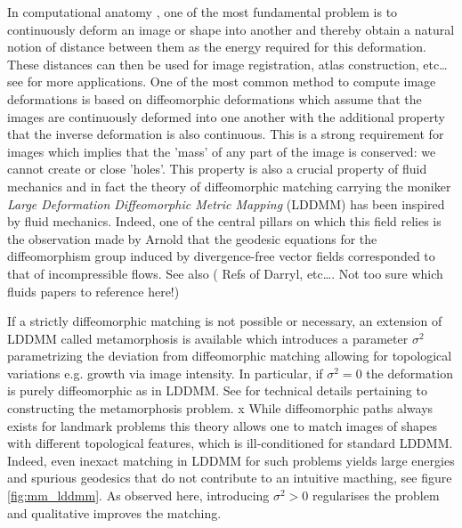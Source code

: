 \documentclass[runningheads]{llncs}
\begin{document}
In computational anatomy
\cite{grenander1994representations,grenander1998computational}, one of the most
fundamental problem is to continuously deform an image or shape into another and
thereby obtain a natural notion of distance between them as the energy required
for this deformation.  These distances can then be used for image registration,
atlas construction, etc\dots see \cite{todo} for more applications. One of the
most common method to compute image deformations is based on diffeomorphic
deformations which assume that the images are continuously deformed into one
another with the additional property that the inverse deformation is also
continuous.  This is a strong requirement for images which implies that the
'mass' of any part of the image is conserved: we cannot create or close 'holes'.
This property is also a crucial property of fluid mechanics and in fact the
theory of diffeomorphic matching carrying the moniker \emph{Large Deformation
Diffeomorphic Metric Mapping} \cite{trouve1998diffeomorphisms,beg2005computing}
(LDDMM) has been inspired by fluid mechanics. Indeed, one of the central pillars
on which this field relies is the observation made by Arnold
\cite{arnold1966geometrie} that the geodesic equations for the diffeomorphism
group induced by divergence-free vector fields corresponded to that of
incompressible flows. See also ({\color{red} Refs of Darryl,
etc\dots.}{\color{green} Not too sure which fluids papers to reference here!}) 

If a strictly diffeomorphic matching is not possible or necessary, an extension
of LDDMM called metamorphosis \cite{trouve2005metamorphoses,holm2009euler} is
available which introduces a parameter $\sigma^2$ parametrizing the deviation
from diffeomorphic matching allowing for topological variations e.g. growth via
image intensity. In particular, if $\sigma^2=0$ the deformation is purely
diffeomorphic as in LDDMM. See
\cite{trouve1995infinite,trouve2005local,miller2001group} for technical details
pertaining to constructing the metamorphosis problem. x While diffeomorphic
paths always exists for landmark problems \cite{guo2006diffeomorphic} this
theory allows one to match images of shapes with different topological features,
which is ill-conditioned for standard LDDMM. Indeed, even inexact matching in
LDDMM for such problems yields large energies and spurious geodesics that do not
contribute to an intuitive macthing, see figure \ref{fig:mm_lddmm}. As observed
here, introducing $\sigma^2>0$ regularises the problem and qualitative improves
the matching.\\
\end{document}

